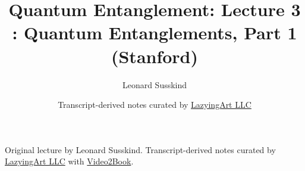 \documentclass[11pt,oneside]{book}
\begin{document}
\frontmatter
\title{Quantum Entanglement: Lecture 3 : Quantum Entanglements, Part 1 (Stanford)}
\author{Leonard Susskind}
\date{Transcript-derived notes curated by \href{https://lazying.art}{LazyingArt LLC}}
\maketitle
\begin{center}
\small Original lecture by Leonard Susskind. Transcript-derived notes curated by \href{https://lazying.art}{LazyingArt LLC} with \href{https://github.com/lachlanchen/Video2Book}{Video2Book}.
\end{center}
\clearpage
\mainmatter

\end{document}
